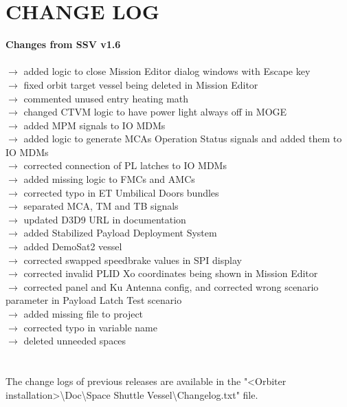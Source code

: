 \documentclass[Space_Shuttle_Vessel_Manual.tex]{subfiles}
\begin{document}
\section{CHANGE LOG}
\label{sec:change-log}
\noindent
\textbf{Changes from SSV v1.6}\\\\
$\rightarrow$ added logic to close Mission Editor dialog windows with Escape key\\
$\rightarrow$ fixed orbit target vessel being deleted in Mission Editor\\
$\rightarrow$ commented unused entry heating math\\
$\rightarrow$ changed CTVM logic to have power light always off in MOGE\\
$\rightarrow$ added MPM signals to IO MDMs\\
$\rightarrow$ added logic to generate MCAs Operation Status signals and added them to IO MDMs\\
$\rightarrow$ corrected connection of PL latches to IO MDMs\\
$\rightarrow$ added missing logic to FMCs and AMCs\\
$\rightarrow$ corrected typo in ET Umbilical Doors bundles\\
$\rightarrow$ separated MCA, TM and TB signals\\
$\rightarrow$ updated D3D9 URL in documentation\\
$\rightarrow$ added Stabilized Payload Deployment System\\
$\rightarrow$ added DemoSat2 vessel\\
$\rightarrow$ corrected swapped speedbrake values in SPI display\\
$\rightarrow$ corrected invalid PLID Xo coordinates being shown in Mission Editor\\
$\rightarrow$ corrected panel and Ku Antenna config, and corrected wrong scenario parameter in Payload Latch Test scenario\\
$\rightarrow$ added missing file to project\\
$\rightarrow$ corrected typo in variable name\\
$\rightarrow$ deleted unneeded spaces\\
\\
\\
The change logs of previous releases are available in the "<Orbiter installation>\textbackslash Doc\textbackslash Space Shuttle Vessel\textbackslash Changelog.txt" file.
\end{document}

